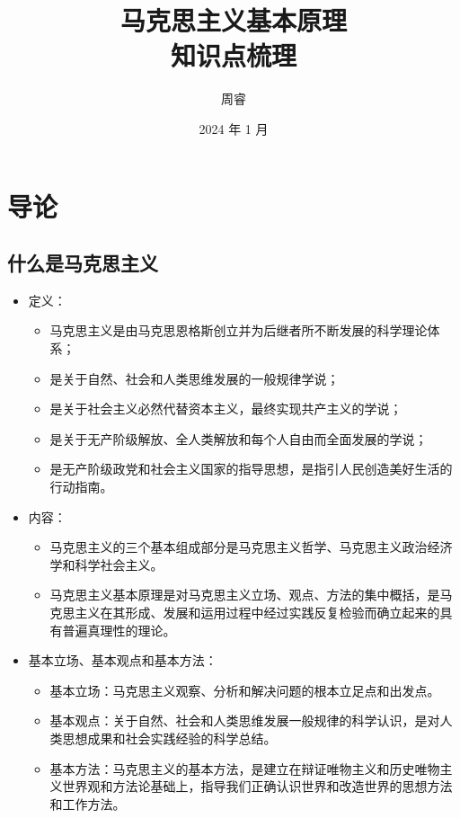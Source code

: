 \documentclass[12pt,openany]{ctexbook}
\title{\bfseries 马克思主义基本原理\\[2pt]\large 知识点梳理}
\author{周睿}
\date{2024 年 1 月}
\begin{document}
\frontmatter
\maketitle
\tableofcontents
\mainmatter
\chapter{导论}
\section{什么是马克思主义}
\begin{itemize}
  \item 定义：
\begin{itemize}
  \item 马克思主义是由马克思恩格斯创立并为后继者所不断发展的科学理论体系；
  \item 是关于自然、社会和人类思维发展的一般规律学说；
  \item 是关于社会主义必然代替资本主义，最终实现共产主义的学说；
  \item 是关于无产阶级解放、全人类解放和每个人自由而全面发展的学说；
  \item 是无产阶级政党和社会主义国家的指导思想，是指引人民创造美好生活的行动指南。
\end{itemize}
  \item 内容：
\begin{itemize}
  \item 马克思主义的三个基本组成部分是马克思主义哲学、马克思主义政治经济学和科学社会主义。
  \item 马克思主义基本原理是对马克思主义立场、观点、方法的集中概括，是马克思主义在其形成、发展和运用过程中经过实践反复检验而确立起来的具有普遍真理性的理论。
\end{itemize}
  \item 基本立场、基本观点和基本方法：
\begin{itemize}
  \item 基本立场：马克思主义观察、分析和解决问题的根本立足点和出发点。
  \item 基本观点：关于自然、社会和人类思维发展一般规律的科学认识，是对人类思想成果和社会实践经验的科学总结。
  \item 基本方法：马克思主义的基本方法，是建立在辩证唯物主义和历史唯物主义世界观和方法论基础上，指导我们正确认识世界和改造世界的思想方法和工作方法。
\end{itemize}
\end{itemize}
\end{document}
